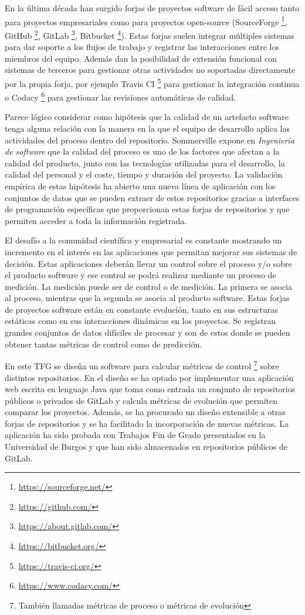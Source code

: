En la última década han surgido forjas de proyectos software de fácil acceso tanto para proyectos empresariales como para proyectos open-source (SourceForge \footnote{\url{https://sourceforge.net/}}, GitHub \footnote{\url{https://github.com/}}, GitLab \footnote{\url{https://about.gitlab.com/}}, Bitbucket  \footnote{\url{https://bitbucket.org/}}).  Estas forjas suelen integrar múltiples sistemas para dar soporte a los flujos de trabajo y registrar las interacciones entre los miembros del equipo. Además dan la posibilidad de extensión funcional con sistemas de terceros para gestionar otras actividades no soportadas directamente por la propia forja, por ejemplo Travis CI \footnote{\url{https://travis-ci.org/}} para gestionar la integración continua o Codacy \footnote{\url{https://www.codacy.com/}} para gestionar las revisiones automáticas de calidad. 

Parece lógico considerar como hipótesis que la calidad de un artefacto software tenga alguna relación con la manera en la que el equipo de desarrollo aplica las actividades del proceso dentro del repositorio. Sommerville expone en \textit{Ingeniería de software} \citep{sommerville_ingenierisoftware_2002} que la calidad del proceso es uno de los factores que afectan a la calidad del producto, junto con las tecnologías utilizadas para el desarrollo, la calidad del personal y el coste, tiempo y duración del proyecto. La validación empírica de estas  hipótesis ha abierto una nueva línea de aplicación con los conjuntos de datos que se pueden extraer de estos repositorios gracias a interfaces de programación específicas que proporcionan estas forjas de repositorios y que permiten acceder a toda la información registrada.

El  desafío a la comunidad científica y empresarial es constante mostrando un incremento en el interés en las aplicaciones que permitan mejorar sus sistemas de decisión. Estas aplicaciones deberán llevar un control sobre el proceso y/o sobre el producto software y ese control se podrá realizar mediante un proceso de medición. La medición puede ser de control o de medición. La primera se asocia al proceso, mientras que la segunda se asocia al producto software. Estas forjas de proyectos software están en constante evolución, tanto en sus estructuras estáticas como en sus interacciones dinámicas en los proyectos. Se registran grandes conjuntos de datos difíciles de procesar y son de estos donde se pueden obtener tantas métricas de control como de predicción.

En este TFG se diseña un software para calcular métricas de control \footnote{También llamadas métricas de proceso o métricas de evolución} sobre distintos repositorios. En el diseño se ha optado por implementar una aplicación web escrita en lenguaje Java que toma como entrada un conjunto de repositorios públicos o privados de GitLab y calcula métricas de evolución que permiten comparar los proyectos. Además, se ha procurado un diseño extensible a otras forjas de repositorios y se ha facilitado la incorporación de nuevas métricas. La aplicación ha sido probada con Trabajos Fin de Grado presentados en la Universidad de Burgos y que han sido almacenados en repositorios públicos de GitLab.

